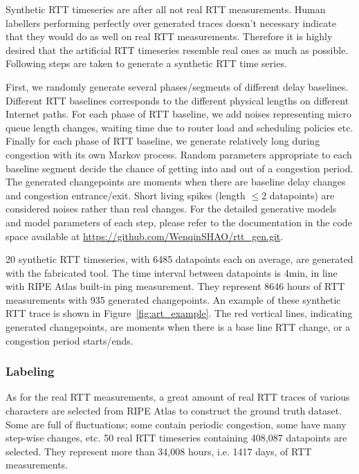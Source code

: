 Synthetic RTT timeseries are after all not real RTT measurements.
Human labellers performing perfectly over generated traces doesn't necessary indicate that they would do as well on real RTT measurements.
Therefore it is highly desired that the artificial RTT timeseries resemble real ones as much as possible.
Following steps are taken to generate a synthetic RTT time series.

First, we randomly generate several phases/segments of different delay baselines.
Different RTT baselines corresponds to the different physical lengths on different Internet paths.
For each phase of RTT baseline, we add noises representing micro queue length changes, waiting time due to router load and scheduling policies etc.
Finally for each phase of RTT baseline, we generate relatively long during congestion with its own Markov process.
Random parameters appropriate to each baseline segment decide the chance of getting into and out of a congestion period.
The generated changepoints are moments when there are baseline delay changes and congestion entrance/exit.
Short living spikes (length $\leq 2$ datapoints) are considered noises rather than real changes.
For the detailed generative models and model parameters of each step, please refer to the documentation in the code space available at \url{https://github.com/WenqinSHAO/rtt_gen.git}.

20 synthetic RTT timeseries, with 6485 datapoints each on average, are generated with the fabricated tool.
The time interval between datapoints is 4min, in line with RIPE Atlas built-in ping measurement.
They represent 8646 hours of RTT measurements with 935 generated changepoints.
An example of these synthetic RTT trace is shown in Figure~\ref{fig:art_example}.
The red vertical lines, indicating generated changepoints, are moments when there is a base line RTT change, or a congestion period starts/ends.

\subsubsection{Labeling}
As for the real RTT measurements, a great amount of real RTT traces of various characters are selected from RIPE Atlas to construct the ground truth dataset.
Some are full of fluctuations; some contain periodic congestion, some have many step-wise changes, etc.
50 real RTT timeseries containing 408,087 datapoints are selected.
They represent more than 34,008 hours, i.e. 1417 days, of RTT measurements. 

